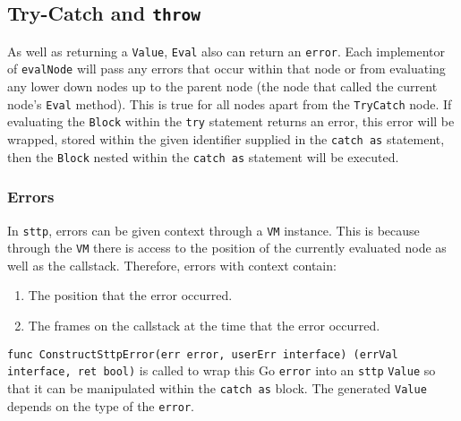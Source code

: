 \cprotect\subsection{Try-Catch and \verb|throw|}

As well as returning a \verb|Value|, \verb|Eval| also can return an \texttt{error}. Each implementor of \verb|evalNode| will pass any errors that occur within that node or from evaluating any lower down nodes up to the parent node (the node that called the current node's \verb|Eval| method). This is true for all nodes apart from the \verb|TryCatch| node. If evaluating the \verb|Block| within the \verb|try| statement returns an error, this error will be wrapped, stored within the given identifier supplied in the \verb|catch as| statement, then the \verb|Block| nested within the \verb|catch as| statement will be executed.

\subsubsection{Errors}

\label{sec:development-try-catch-throw-errors-context}
\begin{definition}
    In \verb|sttp|, errors can be given context through a \verb|VM| instance. This is because through the \verb|VM| there is access to the position of the currently evaluated node as well as the callstack. Therefore, errors with context contain:
    \begin{enumerate}
        \item The position that the error occurred.
        \item The frames on the callstack at the time that the error occurred.
    \end{enumerate}
\end{definition}

\texttt{func ConstructSttpError(err error, userErr interface{}) (errVal interface{}, ret bool)} is called to wrap this Go \texttt{error} into an \verb|sttp| \verb|Value| so that it can be manipulated within the \verb|catch as| block. The generated \verb|Value| depends on the type of the \texttt{error}.

